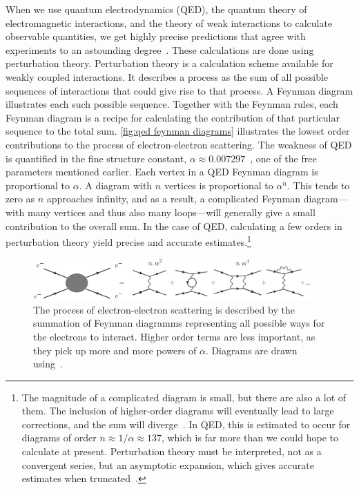 When we use quantum electrodynamics (QED), the quantum theory of electromagnetic interactions, and the theory of weak interactions to calculate observable quantities, we get highly precise predictions that agree with experiments to an astounding degree~\cite{Schwartz:QFT}.
These calculations are done using perturbation theory.
Perturbation theory is a calculation scheme available for weakly coupled interactions.
It describes a process as the sum of all possible sequences of interactions that could give rise to that process.
A Feynman diagram illustrates each such possible sequence.
Together with the Feynman rules, each Feynman diagram is a recipe for calculating the contribution of that particular sequence to the total sum.
\autoref{fig:qed feynman diagrams} illustrates the lowest order contributions to the process of electron-electron scattering.
The weakness of QED is quantified in the fine structure constant, $\alpha \approx 0.00 7297$~\cite{PDG}, one of the free parameters mentioned earlier.
Each vertex in a QED Feynman diagram is proportional to $\alpha$.
A diagram with $n$ vertices is proportional to $\alpha^n$.
This tends to zero as $n$ approaches infinity, and as a result, a complicated Feynman diagram---with many vertices and thus also many loops---will generally give a small contribution to the overall sum.
In the case of QED, calculating a few orders in perturbation theory yield precise and accurate estimates.\footnote{The magnitude of a complicated diagram is small, but there are also a lot of them. The inclusion of higher-order diagrams will eventually lead to large corrections, and the sum will diverge~\cite{dyson:divergence_of_perturbation}. In QED, this is estimated to occur for diagrams of order $n \approx 1 / \alpha \approx 137$, which is far more than we could hope to calculate at present. Perturbation theory must be interpreted, not as a convergent series, but an asymptotic expansion, which gives accurate estimates when truncated~\cite{flory:how_i_learn_to_stop}.}

\begin{figure}[h]
    \centering
    \includegraphics[width=0.95\textwidth]{figurer/feynman-diagram/sum_qed.eps}
    \caption{The process of electron-electron scattering is described by the summation of Feynman diagramms representing all possible ways for the electrons to interact. Higher order terms are less important, as they pick up more and more powers of $\alpha$. Diagrams are drawn using~\cite{JaxoDraw}.}
    \label{fig:qed feynman diagrams}
\end{figure}

